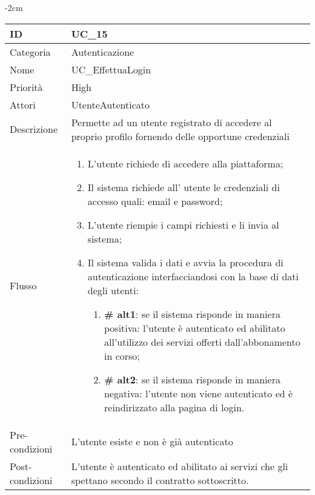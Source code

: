 \begin{center}
\begin{table}[bp]
    \centering
    \addtolength{\leftskip} {-2cm}
\begin{tabular}{ |p{2.6cm}|p{13cm}|  }
\hline
ID & UC\_15 \\\hline
Categoria & Autenticazione \\\hline
Nome & UC\_EffettuaLogin \\\hline
Priorità & High \\\hline
Attori &  UtenteAutenticato \\\hline
Descrizione & Permette ad un utente registrato di accedere al proprio profilo fornendo delle opportune credenziali \\\hline
Flusso &  	\vspace{-5mm} \begin{enumerate}
			\item L'utente richiede di accedere alla piattaforma;
			\item Il sistema richiede all' utente le credenziali di accesso quali: email e password;
			\item L'utente riempie i campi richiesti e li invia al sistema;
			\item Il sistema valida i dati e avvia la procedura di autenticazione interfacciandosi con la base di dati degli utenti:
			\begin{enumerate}[  ]
				\item \textbf{\# alt1}: se il sistema risponde in maniera positiva: l'utente è autenticato ed abilitato all'utilizzo dei servizi offerti dall'abbonamento in corso; 
				\item \textbf{\# alt2}: se il sistema risponde in maniera negativa: l'utente non viene autenticato ed è reindirizzato alla pagina di login.
			\end{enumerate}
		\end{enumerate}\\\hline
Pre-condizioni &  L'utente esiste e non è già autenticato\\\hline
Post-condizioni &  L'utente è autenticato ed abilitato ai servizi che gli spettano secondo il contratto sottoscritto.\\\hline
\end{tabular}
\label{table_use_case:15}\newline
\end{table}


\end{center}
